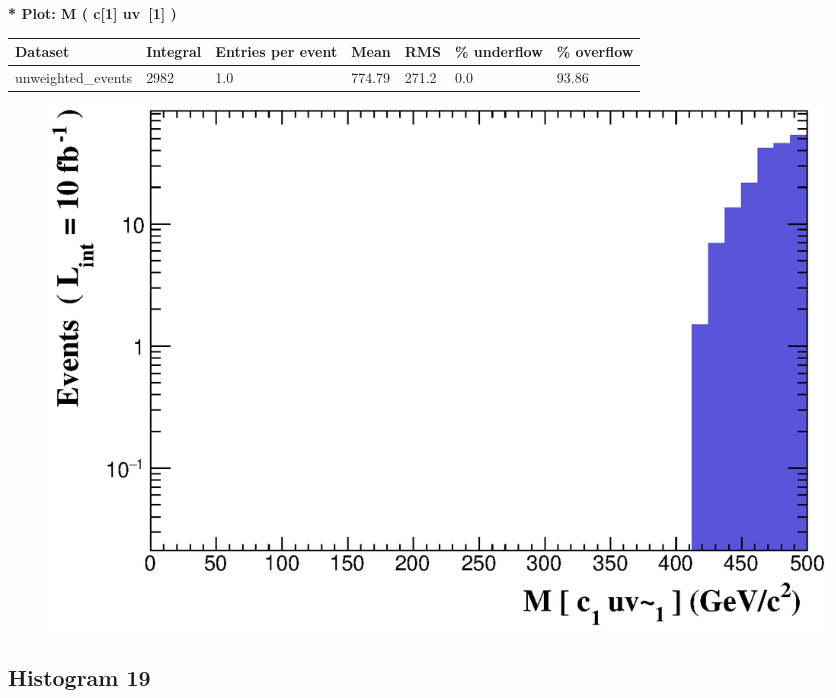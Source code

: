 \documentclass[a4paper, 10pt]{article}
\begin{document}
\textbf{* Plot: M ( c[1] uv~[1] ) }\\
   \begin{table}[H]
  \begin{center}
    \begin{tabular}{|m{23.0mm}|m{23.0mm}|m{18.0mm}|m{19.0mm}|m{19.0mm}|m{19.0mm}|m{19.0mm}|}
      \hline
      {\cellcolor{yellow}         Dataset}& {\cellcolor{yellow}         Integral}& {\cellcolor{yellow}         Entries per event}& {\cellcolor{yellow}         Mean}& {\cellcolor{yellow}         RMS}& {\cellcolor{yellow}         \% underflow}& {\cellcolor{yellow}         \% overflow}\\
      \hline
      {\cellcolor{white}         unweighted\_events}& {\cellcolor{white}         2982}& {\cellcolor{white}         1.0}& {\cellcolor{white}         774.79}& {\cellcolor{white}         271.2}& {\cellcolor{red}         0.0}& {\cellcolor{red}         93.86}\\
\hline
    \end{tabular}
  \end{center}
\end{table}

\begin{figure}[H]
  \begin{center}
    \includegraphics[scale=0.45]{selection_17.eps}\\
\caption{   }
  \end{center}
\end{figure}
      \newpage
\subsection{ Histogram 19}
\end{document}
